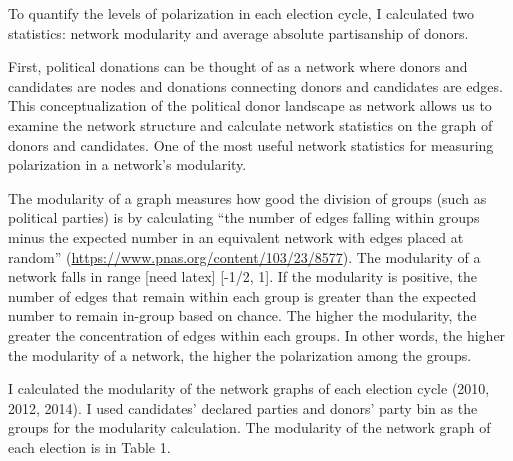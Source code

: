 \documentclass[11pt,]{article}
\begin{document}
To quantify the levels of polarization in each election cycle, I
calculated two statistics: network modularity and average absolute
partisanship of donors.

First, political donations can be thought of as a network where donors
and candidates are nodes and donations connecting donors and candidates
are edges. This conceptualization of the political donor landscape as
network allows us to examine the network structure and calculate network
statistics on the graph of donors and candidates. One of the most useful
network statistics for measuring polarization in a network's modularity.

The modularity of a graph measures how good the division of groups (such
as political parties) is by calculating ``the number of edges falling
within groups minus the expected number in an equivalent network with
edges placed at random''
(\url{https://www.pnas.org/content/103/23/8577}). The modularity of a
network falls in range {[}need latex{]} {[}-1/2, 1{]}. If the modularity
is positive, the number of edges that remain within each group is
greater than the expected number to remain in-group based on chance. The
higher the modularity, the greater the concentration of edges within
each groups. In other words, the higher the modularity of a network, the
higher the polarization among the groups.

I calculated the modularity of the network graphs of each election cycle
(2010, 2012, 2014). I used candidates' declared parties and donors'
party bin as the groups for the modularity calculation. The modularity
of the network graph of each election is in Table 1.
\end{document}
